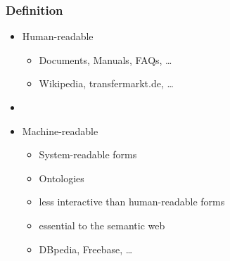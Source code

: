 \begin{frame}
\frametitle{Definition}

\begin{itemize}
    \item Human-readable
    \begin{itemize}
      \item Documents, Manuals, FAQs, \ldots
      \item Wikipedia, transfermarkt.de, \ldots
    \end{itemize}
    \item[]
    \item Machine-readable
    \begin{itemize}
      \item System-readable forms
      \item Ontologies
      \item less interactive than human-readable forms
      \item essential to the semantic web
      \item DBpedia, Freebase, \ldots
    \end{itemize}
    
\end{itemize}

\end{frame}